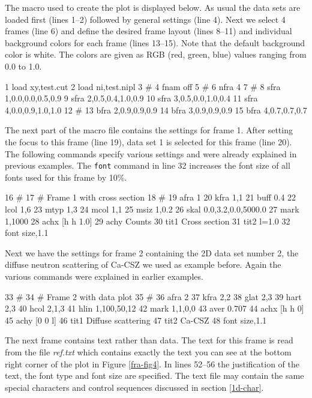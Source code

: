 The macro used to create the plot is displayed below. As usual the
data sets are loaded first (lines 1--2) followed by general
settings (line 4). Next we select 4 frames (line 6) and define the
desired frame layout (lines 8--11) and individual background
colors for each frame (lines 13--15). Note that the default
background color is white. The colors are given as RGB (red,
green, blue) values ranging from 0.0 to 1.0.

\begin{MacVerbatim}
     1  load xy,test.cut
     2  load ni,test.nipl
     3  #
     4  fnam off
     5  #
     6  nfra 4
     7  #
     8  sfra 1,0.0,0.0,0.5,0.9
     9  sfra 2,0.5,0.4,1.0,0.9
    10  sfra 3,0.5,0.0,1.0,0.4
    11  sfra 4,0.0,0.9,1.0,1.0
    12  #
    13  bfra 2,0.9,0.9,0.9
    14  bfra 3,0.9,0.9,0.9
    15  bfra 4,0.7,0.7,0.7
\end{MacVerbatim}

The next part of the macro file contains the settings for frame 1.
After setting the focus to this frame (line 19), data set 1 is
selected for this frame (line 20). The following commands specify
various settings and were already explained in previous examples.
The {\tt font} command in line 32 increases the font size of all
fonts used for this frame by 10\%.

\begin{MacVerbatim}
    16  #
    17  # Frame 1 with cross section
    18  #
    19  afra 1
    20  kfra 1,1
    21  buff 0.4
    22  lcol 1,6
    23  mtyp 1,3
    24  mcol 1,1
    25  msiz 1,0.2
    26  skal 0.0,3.2,0.0,5000.0
    27  mark 1,1000
    28  achx [h h 1.0]
    29  achy Counts
    30  tit1 Cross section
    31  tit2 l=1.0
    32  font size,1.1
\end{MacVerbatim}

Next we have the settings for frame 2 containing the 2D data set
number 2, the diffuse neutron scattering of Ca-CSZ we used as example
before. Again the various commands were  explained in earlier examples.

\begin{MacVerbatim}
    33  #
    34  # Frame 2 with data plot
    35  #
    36  afra 2
    37  kfra 2,2
    38  glat 2,3
    39  hart 2,3
    40  hcol 2,1,3
    41  hlin 1,100,50,12
    42  mark 1,1,0,0
    43  aver 0.707
    44  achx [h h 0]
    45  achy [0 0 l]
    46  tit1 Diffuse scattering
    47  tit2 Ca-CSZ
    48  font size,1.1
\end{MacVerbatim}

The next frame contains text rather than data.  The text for this
frame is read from the file {\it ref.txt} which contains exactly the
text you can see at the bottom right corner of the plot in Figure
\ref{fra-fig4}.  In lines 52--56 the justification of the text, the
font type and font size are specified. The text file may contain the
same special characters and control sequences discussed in section
\ref{1d-char}.

